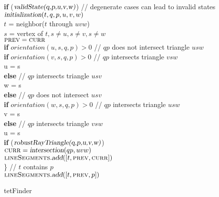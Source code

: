 \documentclass[../thesis.tex]{subfiles}
\begin{document}
\begin{algo*}
{\begin{numbertabbing}
      \> \> \textbf{if} ($\textsl{validState(q,p,u,v,w)}$) // degenerate cases can lead to invalid states \label{}\\
      \> \> \> $\textsl{initialization}(t, q,p,u,v,w)$ \label{}\\
      \> \> $t$ = neighbor($t$ through $uvw$) \label{}\\
      \> \> $s$ = vertex of $t, s \neq u, s \neq v, s \neq w$ \label{}\\
      \> \> $\textsc{prev} = \textsc{curr}$ \label{}\\
      \> \> \textbf{if} $orientation(u,s,q,p) > 0$ // $qp$ does not intersect triangle $usw$\label{}\\
      \> \> \> \textbf{if} $orientation(v,s,q,p) > 0$ // $qp$ intersects triangle $vsw$ \label{}\\
      \> \> \> \> u = s \label{}\\
      \> \> \> \textbf{else} // $qp$ intersects triangle $usv$ \label{}\\
      \> \> \> \> w = s \label{}\\
      \> \> \textbf{else} // $qp$ does not intersect $usv$ \label{}\\
      \> \> \> \textbf{if} $orientation(w,s,q,p) > 0$ // $qp$ intersects triangle $usw$ \label{}\\
      \> \> \> \> v = s \label{}\\
      \> \> \> \textbf{else} // $qp$ intersects triangle $vsw$ \label{}\\
      \> \> \> \> u = s \label{}\\
      \> \> \textbf{if} ($\textsl{robustRayTriangle(q,p,u,v,w)}$)\label{}\\
      \> \> \> $\textsc{curr} = \textsl{intersection}(qp, uvw)$ \label{}\\
      \> \> \> $\textsc{lineSegments}.\textsl{add}([t, \textsc{prev}, \textsc{curr}])$ \label{}\\
      \> \} // $t$ contains $p$ \label{}\\
      \> $\textsc{lineSegments}.\textsl{add}([t, \textsc{prev}, p])$ \label{}\\
    \end{numbertabbing}
  }
  \caption{tetFinder}
  \label{alg:tetFinder}
\end{algo*}
  
\end{document}
